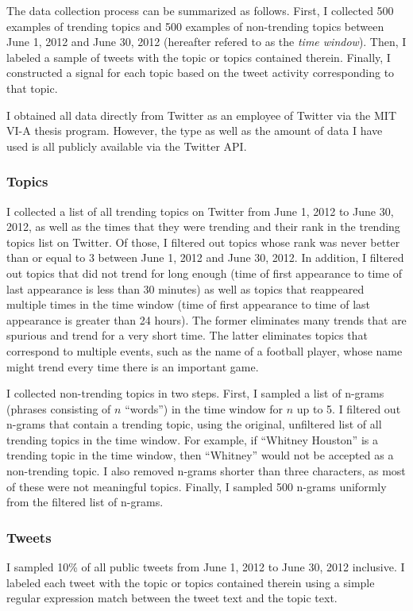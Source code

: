 The data collection process can be summarized as follows. First, I collected 500
examples of trending topics and 500 examples of non-trending topics between June
1, 2012 and June 30, 2012 (hereafter refered to as the {\em time window}). Then,
I labeled a sample of tweets with the topic or topics contained
therein. Finally, I constructed a signal for each topic based on the tweet
activity corresponding to that topic.

I obtained all data directly from Twitter as an employee of Twitter via the MIT
VI-A thesis program. However, the type as well as the amount of data I have used
is all publicly available via the Twitter API.

\subsubsection{Topics}
I collected a list of all trending topics on Twitter from June 1, 2012 to June
30, 2012, as well as the times that they were trending and their rank in the
trending topics list on Twitter. Of those, I filtered out topics whose rank was
never better than or equal to 3 between June 1, 2012 and June 30, 2012. In
addition, I filtered out topics that did not trend for long enough (time of
first appearance to time of last appearance is less than 30 minutes) as well as
topics that reappeared multiple times in the time window (time of first
appearance to time of last appearance is greater than 24 hours). The former
eliminates many trends that are spurious and trend for a very short time. The
latter eliminates topics that correspond to multiple events, such as the name of
a football player, whose name might trend every time there is an important game.

I collected non-trending topics in two steps. First, I sampled a list of n-grams
(phrases consisting of $n$ ``words'') in the time window for $n$ up to 5. I
filtered out n-grams that contain a trending topic, using the original,
unfiltered list of all trending topics in the time window. For example, if
``Whitney Houston'' is a trending topic in the time window, then ``Whitney''
would not be accepted as a non-trending topic. I also removed n-grams shorter
than three characters, as most of these were not meaningful topics. Finally, I
sampled 500 n-grams uniformly from the filtered list of n-grams.

\subsubsection{Tweets}
I sampled 10\% of all public tweets from June 1, 2012 to June 30, 2012
inclusive. I labeled each tweet with the topic or topics contained therein using
a simple regular expression match between the tweet text and the topic text. 

